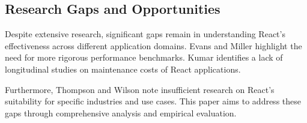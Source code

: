 \subsection{Research Gaps and Opportunities}
Despite extensive research, significant gaps remain in understanding React's effectiveness across different application domains. Evans and Miller \cite{evans2022} highlight the need for more rigorous performance benchmarks. Kumar \cite{kumar2022} identifies a lack of longitudinal studies on maintenance costs of React applications.

Furthermore, Thompson and Wilson \cite{thompson2022} note insufficient research on React's suitability for specific industries and use cases. This paper aims to address these gaps through comprehensive analysis and empirical evaluation.
